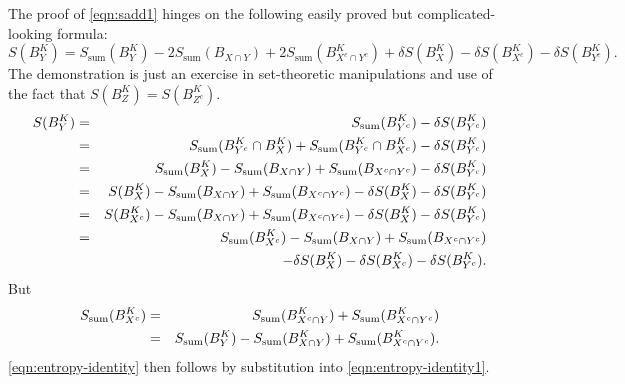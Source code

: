 \documentclass[12pt]{article}
\newcommand{\be}{\begin{equation}}
\newcommand{\ee}{\end{equation}}
\newcommand{\beq}{\begin{eqnarray}}
\newcommand{\eeq}{\end{eqnarray}}
\def\Sadd{{S_{\text{sum}}}}
\numberwithin{equation}{section}
\begin{document}
The proof of \eqref{eqn:sadd1} hinges on the following easily proved but complicated-looking formula:
\be \label{eqn:entropy-identity}
S(B_Y^K)
= \Sadd( B_Y^K ) - 2 \Sadd( B_{X \cap Y} ) + 2 \Sadd( B^K_{X^c \cap Y^c} )
	+  \delta S( B_X^K ) - \delta S( B_{X^c}^K ) - \delta S( B_{Y^c}^K ).
\ee
The demonstration is just an exercise in set-theoretic manipulations and use of the fact that $S(B_Z^K) = S(B_{Z^c}^K)$.
\beq
S(B_Y^K)
&=& S_{\rm{sum}}( B_{Y^c}^K ) - \delta S(B_{Y^c}^K) \\
&=& S_{\rm{sum}}( B_{Y^c}^K \cap B_X^K ) + S_{\rm{sum}}( B_{Y^c}^K \cap B_{X^c}^K ) - \delta S(B_{Y^c}^K) \\
&=& S_{\rm{sum}}( B_X^K ) - S_{\rm{sum}}( B_{X \cap Y}) + S_{\rm{sum}}( B_{X^c \cap Y^c} ) - \delta S(B_{Y^c}^K) \\
&=& S( B_X^K ) - S_{\rm{sum}}( B_{X \cap Y}) + S_{\rm{sum}}( B_{X^c \cap Y^c} ) - \delta S(B_X^K) - \delta S(B_{Y^c}^K) \\
&=& S( B_{X^c}^K) - S_{\rm{sum}}( B_{X \cap Y}) + S_{\rm{sum}}( B_{X^c \cap Y^c} ) - \delta S(B_X^K)
	- \delta S(B_{Y^c}^K) \\
&=&
S_{\rm{sum}}( B_{X^c}^K) - S_{\rm{sum}}( B_{X \cap Y}) + S_{\rm{sum}}( B_{X^c \cap Y^c} ) \nonumber \\
&\,& \quad \quad \quad	 - \delta S(B_X^K) - \delta S(B_{X^c}^K) - \delta S(B_{Y^c}^K).
 \label{eqn:entropy-identity1}
\eeq
But
\beq
S_{\rm{sum}}( B_{X^c}^K )
&=& S_{\rm{sum}}( B_{X^c \cap Y}^K ) + S_{\rm{sum}}( B_{X^c \cap Y^c}^K ) \\
&=& S_{\rm{sum}}( B_Y^K ) - S_{\rm{sum}}( B_{X\cap Y}^K ) + S_{\rm{sum}}( B_{X^c \cap Y^c}^K ).
\eeq
\eqref{eqn:entropy-identity} then follows by substitution into \eqref{eqn:entropy-identity1}.
\end{document}

